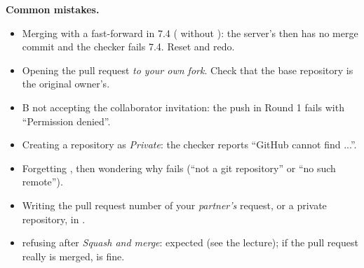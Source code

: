 \textbf{Common mistakes.}
\begin{itemize}
  \item Merging with a fast-forward in 7.4 ( without ): the server's  then has no merge commit and the checker fails 7.4. Reset and redo.
  \item Opening the pull request \emph{to your own fork}. Check that the base repository is the original owner's.
  \item B not accepting the collaborator invitation: the push in Round 1 fails with ``Permission denied''.
  \item Creating a repository as \emph{Private}: the checker reports ``GitHub cannot find ...''.
  \item Forgetting , then wondering why  fails (``not a git repository'' or ``no such remote'').
  \item Writing the pull request number of your \emph{partner's} request, or a private repository, in .
  \item {} refusing after \emph{Squash and merge}: expected (see the lecture); if the pull request really is merged,  is fine.
\end{itemize}
